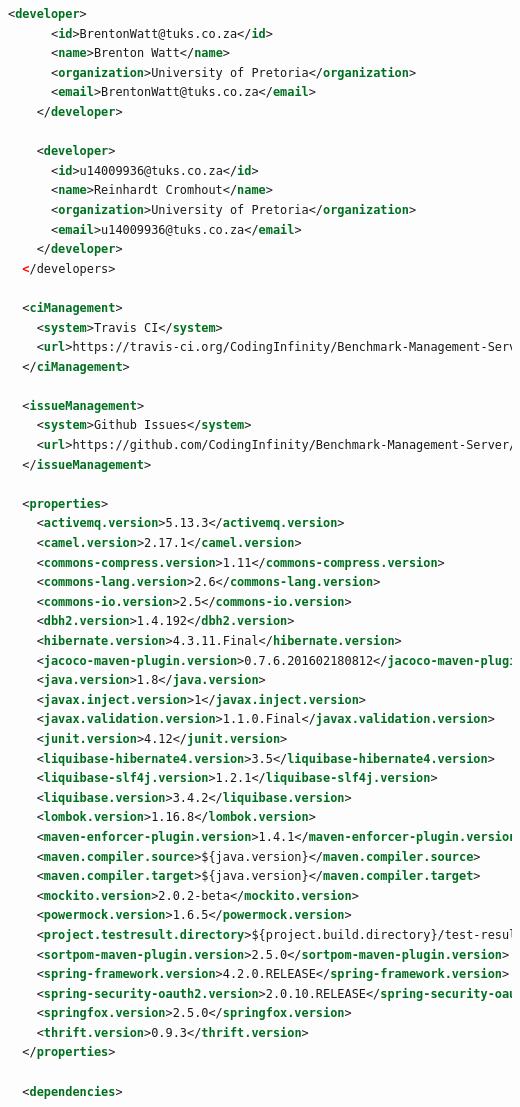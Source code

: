 \documentclass[11pt,a4paper]{article}
\begin{document}
\begin{lstlisting}[language=xml]
    <developer>
      <id>BrentonWatt@tuks.co.za</id>
      <name>Brenton Watt</name>
      <organization>University of Pretoria</organization>
      <email>BrentonWatt@tuks.co.za</email>
    </developer>

    <developer>
      <id>u14009936@tuks.co.za</id>
      <name>Reinhardt Cromhout</name>
      <organization>University of Pretoria</organization>
      <email>u14009936@tuks.co.za</email>
    </developer>
  </developers>

  <ciManagement>
    <system>Travis CI</system>
    <url>https://travis-ci.org/CodingInfinity/Benchmark-Management-Server</url>
  </ciManagement>

  <issueManagement>
    <system>Github Issues</system>
    <url>https://github.com/CodingInfinity/Benchmark-Management-Server/issues</url>
  </issueManagement>

  <properties>
    <activemq.version>5.13.3</activemq.version>
    <camel.version>2.17.1</camel.version>
    <commons-compress.version>1.11</commons-compress.version>
    <commons-lang.version>2.6</commons-lang.version>
    <commons-io.version>2.5</commons-io.version>
    <dbh2.version>1.4.192</dbh2.version>
    <hibernate.version>4.3.11.Final</hibernate.version>
    <jacoco-maven-plugin.version>0.7.6.201602180812</jacoco-maven-plugin.version>
    <java.version>1.8</java.version>
    <javax.inject.version>1</javax.inject.version>
    <javax.validation.version>1.1.0.Final</javax.validation.version>
    <junit.version>4.12</junit.version>
    <liquibase-hibernate4.version>3.5</liquibase-hibernate4.version>
    <liquibase-slf4j.version>1.2.1</liquibase-slf4j.version>
    <liquibase.version>3.4.2</liquibase.version>
    <lombok.version>1.16.8</lombok.version>
    <maven-enforcer-plugin.version>1.4.1</maven-enforcer-plugin.version>
    <maven.compiler.source>${java.version}</maven.compiler.source>
    <maven.compiler.target>${java.version}</maven.compiler.target>
    <mockito.version>2.0.2-beta</mockito.version>
    <powermock.version>1.6.5</powermock.version>
    <project.testresult.directory>${project.build.directory}/test-results</project.testresult.directory>
    <sortpom-maven-plugin.version>2.5.0</sortpom-maven-plugin.version>
    <spring-framework.version>4.2.0.RELEASE</spring-framework.version>
    <spring-security-oauth2.version>2.0.10.RELEASE</spring-security-oauth2.version>
    <springfox.version>2.5.0</springfox.version>
    <thrift.version>0.9.3</thrift.version>
  </properties>

  <dependencies>


\end{lstlisting}
\end{document}
